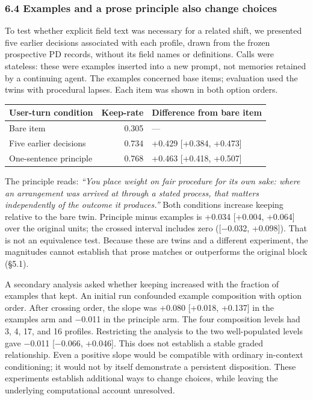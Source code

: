 \documentclass[
  11pt]{article}
\begin{document}
\subsubsection{6.4 Examples and a prose principle also change
choices}\label{examples-and-a-prose-principle-also-change-choices}

To test whether explicit field text was necessary for a related shift,
we presented five earlier decisions associated with each profile, drawn
from the frozen prospective PD records, without its field names or
definitions. Calls were stateless: these were examples inserted into a
new prompt, not memories retained by a continuing agent. The examples
concerned base items; evaluation used the twins with procedural lapses.
Each item was shown in both option orders.

\begin{longtable}[]{@{}lrl@{}}
\toprule\noalign{}
User-turn condition & Keep-rate & Difference from bare item \\
\midrule\noalign{}
\endhead
\bottomrule\noalign{}
\endlastfoot
Bare item & 0.305 & --- \\
Five earlier decisions & 0.734 & +0.429 {[}+0.384, +0.473{]} \\
One-sentence principle & 0.768 & +0.463 {[}+0.418, +0.507{]} \\
\end{longtable}

The principle reads: \emph{``You place weight on fair procedure for its
own sake: where an arrangement was arrived at through a stated process,
that matters independently of the outcome it produces.''} Both
conditions increase keeping relative to the bare twin. Principle minus
examples is +0.034 {[}+0.004, +0.064{]} over the original units; the
crossed interval includes zero ({[}−0.032, +0.098{]}). That is not an
equivalence test. Because these are twins and a different experiment,
the magnitudes cannot establish that prose matches or outperforms the
original block (§5.1).

A secondary analysis asked whether keeping increased with the fraction
of examples that kept. An initial run confounded example composition
with option order. After crossing order, the slope was +0.080 {[}+0.018,
+0.137{]} in the examples arm and −0.011 in the principle arm. The four
composition levels had 3, 4, 17, and 16 profiles. Restricting the
analysis to the two well-populated levels gave −0.011 {[}−0.066,
+0.046{]}. This does not establish a stable graded relationship. Even a
positive slope would be compatible with ordinary in-context
conditioning; it would not by itself demonstrate a persistent
disposition. These experiments establish additional ways to change
choices, while leaving the underlying computational account unresolved.
\end{document}
